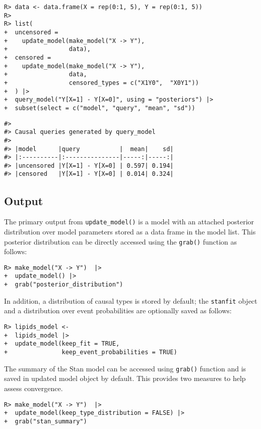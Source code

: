 \documentclass[
  11pt,
  article]{jss}
\begin{document}
\begin{verbatim}
R> data <- data.frame(X = rep(0:1, 5), Y = rep(0:1, 5))
R> 
R> list(
+  uncensored = 
+    update_model(make_model("X -> Y"),
+                 data),
+  censored = 
+    update_model(make_model("X -> Y"), 
+                 data, 
+                 censored_types = c("X1Y0",  "X0Y1"))
+  ) |>
+  query_model("Y[X=1] - Y[X=0]", using = "posteriors") |> 
+  subset(select = c("model", "query", "mean", "sd"))
\end{verbatim}

\begin{verbatim}
#> 
#> Causal queries generated by query_model
#> 
#> |model      |query           |  mean|    sd|
#> |:----------|:---------------|-----:|-----:|
#> |uncensored |Y[X=1] - Y[X=0] | 0.597| 0.194|
#> |censored   |Y[X=1] - Y[X=0] | 0.014| 0.324|
\end{verbatim}

\subsection{Output}\label{output}

The primary output from \texttt{update\_model()} is a model with an
attached posterior distribution over model parameters stored as a data
frame in the model list. This posterior distribution can be directly
accessed using the \texttt{grab()} function as follows:

\begin{verbatim}
R> make_model("X -> Y")  |> 
+  update_model() |>
+  grab("posterior_distribution")  
\end{verbatim}

In addition, a distribution of causal types is stored by default; the
\texttt{stanfit} object and a distribution over event probabilities are
optionally saved as follows:

\begin{verbatim}
R> lipids_model <- 
+  lipids_model |> 
+  update_model(keep_fit = TRUE,
+               keep_event_probabilities = TRUE)
\end{verbatim}

The summary of the Stan model can be accessed using \texttt{grab()}
function and is saved in updated model object by default. This provides
two measures to help assess convergence.

\begin{verbatim}
R> make_model("X -> Y")  |> 
+  update_model(keep_type_distribution = FALSE) |>
+  grab("stan_summary") 
\end{verbatim}
\end{document}
